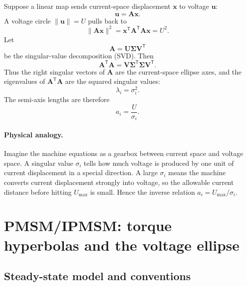 \documentclass[11pt,a4paper]{article}
\newcommand{\T}{\mathsf{T}}
\newcommand{\vct}[1]{\bm{#1}}
\newcommand{\mat}[1]{\bm{#1}}
\begin{document}
Suppose a linear map sends current-space displacement $\vct x$ to voltage $\vct u$:
\begin{equation}
  \vct u=\mat A\vct x.
\end{equation}
A voltage circle $\|\vct u\|=U$ pulls back to
\begin{equation}
  \|\mat A\vct x\|^2
  =\vct x^\T\mat A^\T\mat A\vct x
  =U^2.
\end{equation}
Let
\begin{equation}
  \mat A=\mat U\mat\Sigma\mat V^\T
\end{equation}
be the singular-value decomposition (SVD). Then
\begin{equation}
  \mat A^\T\mat A
  =\mat V\mat\Sigma^\T\mat\Sigma\mat V^\T.
\end{equation}
Thus the right singular vectors of $\mat A$ are the current-space ellipse axes, and the eigenvalues of $\mat A^\T\mat A$ are the squared singular values:
\begin{equation}
  \lambda_i=\sigma_i^2.
\end{equation}
The semi-axis lengths are therefore
\begin{equation}
  a_i=\frac{U}{\sigma_i}.
  \label{eq:svd-axis}
\end{equation}

\paragraph{Physical analogy.}
Imagine the machine equations as a gearbox between current space and voltage space. A singular value $\sigma_i$ tells how much voltage is produced by one unit of current displacement in a special direction. A large $\sigma_i$ means the machine converts current displacement strongly into voltage, so the allowable current distance before hitting $U_{\max}$ is small. Hence the inverse relation $a_i=U_{\max}/\sigma_i$.

\section{PMSM/IPMSM: torque hyperbolas and the voltage ellipse}

\subsection{Steady-state model and conventions}
\end{document}
